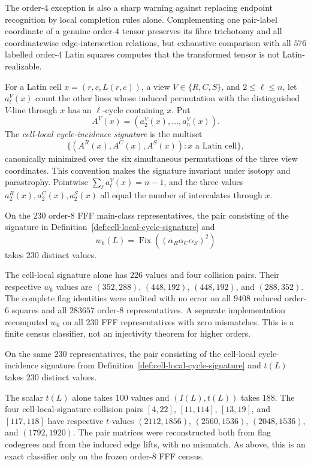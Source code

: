 The order-$4$ exception is also a sharp warning against replacing endpoint
recognition by local completion rules alone.  Complementing one pair-label
coordinate of a genuine order-$4$ tensor preserves its fibre trichotomy and
all coordinatewise edge-intersection relations, but exhaustive comparison
with all $576$ labelled order-$4$ Latin squares computes that the transformed
tensor is not Latin-realizable.

\begin{definition}
\label{def:cell-local-cycle-signature}
For a Latin cell $x=(r,c,L(r,c))$, a view
$V\in\{R,C,S\}$, and $2\leq\ell\leq n$, let $a^V_\ell(x)$ count the other
lines whose induced permutation with the distinguished $V$-line through $x$
has an $\ell$-cycle containing $x$.  Put
\[
 A^V(x)=(a^V_2(x),\ldots,a^V_n(x)).
\]
The \emph{cell-local cycle-incidence signature} is the multiset
\[
 \bigl\{(A^R(x),A^C(x),A^S(x)):x\text{ a Latin cell}\bigr\},
\]
canonically minimized over the six simultaneous permutations of the three
view coordinates.  This convention makes the signature invariant under
isotopy and parastrophy.  Pointwise
$\sum_\ell a^V_\ell(x)=n-1$, and the three values
$a^R_2(x),a^C_2(x),a^S_2(x)$ all equal the number of intercalates through
$x$.
\end{definition}

\begin{computationaltheorem}
\label{cthm:rainbow-classifier}
On the $230$ order-$8$ FFF main-class representatives, the pair consisting of
the signature in Definition~\ref{def:cell-local-cycle-signature} and
\[
 w_6(L)=\operatorname{Fix}((\alpha_R\alpha_C\alpha_S)^2)
\]
takes $230$ distinct values.
\end{computationaltheorem}

The cell-local signature alone has $226$ values and four collision pairs.
Their respective $w_6$ values are
$(352,288)$, $(448,192)$, $(448,192)$, and $(288,352)$.  The complete
flag identities were audited with no error on all $9408$ reduced order-$6$
squares and all $283657$ order-$8$ representatives.  A separate
implementation recomputed $w_6$ on all $230$ FFF representatives with zero
mismatches.  This is a finite census classifier, not an injectivity theorem
for higher orders.

\begin{computationaltheorem}
\label{cthm:pair-triangle-classifier}
On the same $230$ representatives, the pair consisting of the
cell-local cycle-incidence signature from
Definition~\ref{def:cell-local-cycle-signature} and $t(L)$ takes $230$
distinct values.
\end{computationaltheorem}

The scalar $t(L)$ alone takes $100$ values and $(I(L),t(L))$ takes $188$.
The four cell-local-signature collision pairs $[4,22]$, $[11,114]$,
$[13,19]$, and
$[117,118]$ have respective $t$-values
$(2112,1856)$, $(2560,1536)$, $(2048,1536)$, and $(1792,1920)$.
The pair matrices were reconstructed both from flag codegrees and from the
induced edge lifts, with no mismatch.  As above, this is an exact classifier
only on the frozen order-$8$ FFF census.
